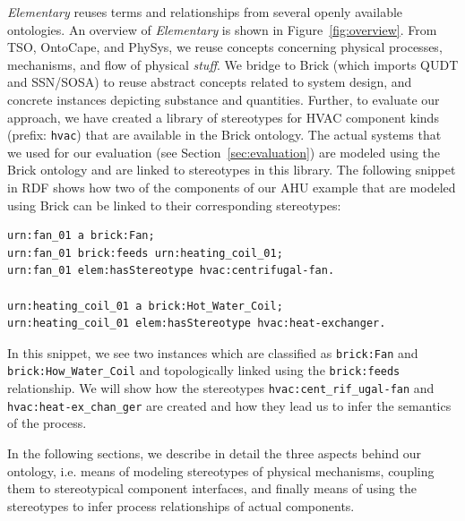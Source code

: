\documentclass[sigconf]{acmart}
\begin{document}
\textit{Elementary} reuses terms and relationships from several openly available ontologies. An overview of \emph{Elementary} is shown in Figure~\ref{fig:overview}.
From TSO, OntoCape, and PhySys, we reuse concepts concerning physical processes, mechanisms, and flow of physical \textit{stuff}.
We bridge to Brick (which imports QUDT and SSN/SOSA) to reuse abstract concepts related to system design, and concrete instances depicting substance and quantities.
Further, to evaluate our approach, we have created a library of stereotypes for HVAC component kinds (prefix: \texttt{hvac}) that are available in the Brick ontology.
The actual systems that we used for our evaluation (see Section~\ref{sec:evaluation}) are modeled using the Brick ontology and are linked to stereotypes in this library.
The following snippet in RDF shows how two of the components of our AHU example that are modeled using Brick can be linked to their corresponding stereotypes:

\begin{lstlisting}[language=SPARQL]
urn:fan_01 a brick:Fan;
urn:fan_01 brick:feeds urn:heating_coil_01;
urn:fan_01 elem:hasStereotype hvac:centrifugal-fan.

urn:heating_coil_01 a brick:Hot_Water_Coil;
urn:heating_coil_01 elem:hasStereotype hvac:heat-exchanger.
\end{lstlisting}

In this snippet, we see two instances which are classified as \texttt{brick:Fan} and \texttt{brick:How\_Water\_Coil} and topologically linked using the \texttt{brick:feeds} relationship.
We will show how the stereotypes \texttt{hvac:cent\_rif\_ugal-fan} and \texttt{hvac:heat-ex\_chan\_ger} are created and how they lead us to infer the semantics of the process.

In the following sections, we describe in detail the three aspects behind our ontology, i.e. means of modeling stereotypes of physical mechanisms, coupling them to stereotypical component interfaces, and finally means of using the stereotypes to infer process relationships of actual components.
\end{document}
